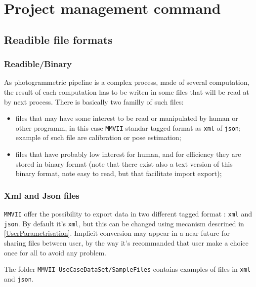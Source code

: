 \chapter{Project management command}

\section{Readible file formats}

\subsection{Readible/Binary}

As photogrammetric pipeline is a complex process, made of several computation,
the result of each computation has to be writen in some files that
will be read at by next process. There is basically two familly of such files:

\begin{itemize}
   \item files that may have some interest to  be read or manipulated by human
         or other programm, in this case {\tt MMVII} standar tagged format
	 as {\tt xml} of {\tt json}; example of such file are calibration
	 or pose estimation;

   \item files that have probably low interest for human, and for efficiency 
         they are stored in binary format  (note that there exist also a
         text version of this binary format, note easy to read, but that facilitate
	   import export);
\end{itemize}

\subsection{Xml and Json files}

{\tt MMVII} offer the possibility to export data in two different tagged format : {\tt xml} and
{\tt json}. By default it's {\tt xml}, but this can be changed using mecanism descrined in \ref{UserParametrisation}.
Implicit conversion may appear in a near future for sharing files between user,
by the way it's recommanded that user make a choice once for all  to avoid any problem.

The folder {\tt MMVII-UseCaseDataSet/SampleFiles} contains examples
of files in {\tt xml} and {\tt json}. 

